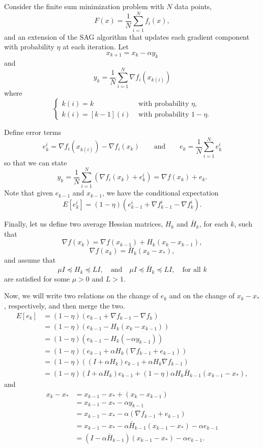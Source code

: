 \documentclass{article}
\begin{document}
 
\noindent 
Consider the finite sum minimization problem with $N$ data points, 
\[
 F(x) = \frac{1}{N}\sum_{i=1}^N f_i(x),
\]
and an extension of the SAG algorithm that updates each gradient component with probability $\eta$ at each iteration.  Let 
\[
 x_{k+1} = x_k -\alpha y_k
\]
and
\[
 y_k = \frac{1}{N}\sum_{i=1}^N \nabla f_i(x_{k(i)}) 
\]
where
\[
 \begin{cases}
  k(i) = k  & \mbox{ with probability }\eta,\\
  k(i) = [k-1](i) & \mbox{ with probability }1-\eta.
 \end{cases}
\]

\bigskip

\noindent
Define error terms 
\[
 e_k^i = \nabla f_i(x_{k(i)})-\nabla f_i(x_k) \qquad \mbox{and} \qquad e_k=\frac{1}{N}\sum_{i=1}^N e_k^i
\]
so that we can state 
\[
 y_k = \frac{1}{N}\sum_{i=1}^N (\nabla f_i(x_k)+e_k^i) = \nabla f(x_k) + e_k.
\]
Note that given $e_{k-1}$ and $x_{k-1}$, we have the conditional expectation 
\[
 E[e_k^i] = (1-\eta)(e_{k-1}^i + \nabla f_{k-1}^i - \nabla f_k^i).
\]

\bigskip
\noindent
Finally, let us define two average Hessian matrices, $H_k$ and $\bar H_k$, for each $k$, such that
\[
 \nabla f(x_k) = \nabla f(x_{k-1})+H_k(x_k-x_{k-1}),
\]
\[
 \nabla f(x_k) = \bar H_k(x_k-x_\ast),
\]
and assume that 
\[
  \mu I \preceq H_k \preceq L I , \quad \mbox{and} \quad \mu I \preceq \bar H_k \preceq L I,\quad \mbox{for all }k
\]
are satisfied for some $\mu>0$ and $L>1$.

\bigskip

\noindent 
Now, we will write two relations on the change of $e_k$ and on the change of $x_k-x_\ast$, respectively, and then merge the two.
 \begin{align*}
  E[e_k] &= (1-\eta)(e_{k-1} + \nabla f_{k-1} - \nabla f_k)\\
  &= (1-\eta)(e_{k-1} - H_k(x_k-x_{k-1}))\\
  &= (1-\eta)(e_{k-1} - H_k(-\alpha y_{k-1}))\\
  &= (1-\eta)\left(e_{k-1} + \alpha H_k (\nabla f_{k-1}+e_{k-1})\right)\\
  &= (1-\eta)\left((I+\alpha H_k)e_{k-1} + \alpha H_k\nabla f_{k-1}\right)\\ 
  &= (1-\eta)(I+\alpha H_k)e_{k-1} + (1-\eta)\alpha H_k\bar H_{k-1}(x_{k-1}-x_\ast),
 \end{align*}
and
 \begin{align*}
  x_k-x_\ast &= x_{k-1}-x_\ast + (x_k-x_{k-1})\\
  &=x_{k-1}-x_\ast -\alpha y_{k-1}\\
  &=x_{k-1}-x_\ast -\alpha (\nabla f_{k-1} + e_{k-1})\\
  &=x_{k-1}-x_\ast -\alpha\bar H_{k-1}(x_{k-1}-x_\ast) -\alpha e_{k-1}\\
  &=(I-\alpha\bar H_{k-1})(x_{k-1}-x_\ast) -\alpha e_{k-1}.
 \end{align*}
 
\end{document}
